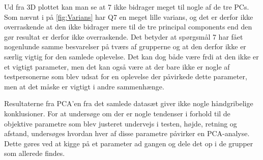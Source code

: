 \noindent
%
Ud fra 3D plottet kan man se at 7 ikke bidrager meget til nogle af de tre PCs. Som nævnt i  på \autoref{fig:Varians} har Q7 en meget lille varians, og det er derfor ikke overraskende at den ikke bidrager mere til de tre principal components end den gør resultat er derfor ikke overraskende. Det betyder at spørgsmål 7 har fået nogenlunde samme besvarelser på tværs af grupperne og at den derfor ikke er særlig vigtig for den samlede oplevelse. Det kan dog både være frdi at den ikke er et vigtigt parameter, men det kan også være at der bare ikke er nogle af testpersonerne som blev udsat for en oplevelse der påvirkede dette parameter, men at det måske er vigtigt i andre sammenhænge. 

Resultaterne fra PCA'en fra det samlede datasæt giver ikke nogle håndgribelige konklusioner. For at undersøge om der er nogle tendenser i forhold til de objektive parametre som blev justeret undervejs i testen, højde, retning og afstand, undersøges hvordan hver af disse parametre påvirker en PCA-analyse. Dette gøres ved at kigge på et parameter ad gangen og dele det op i de grupper som allerede findes.